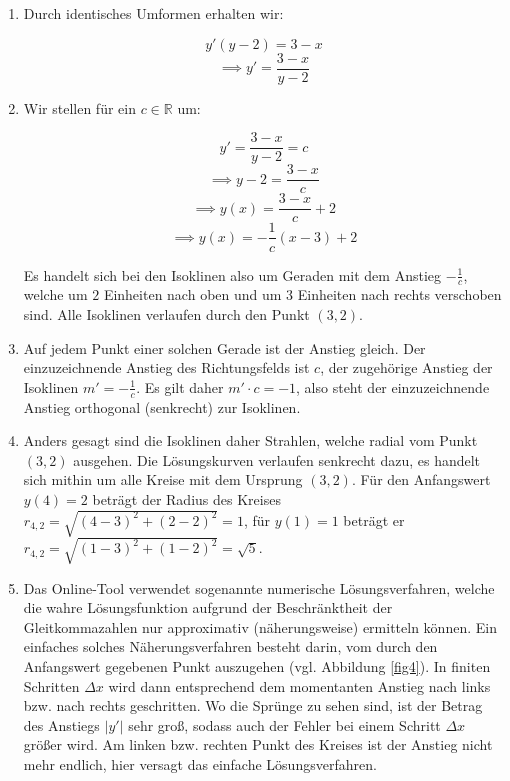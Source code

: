 \item

\begin{enumerate}
\item Durch identisches Umformen erhalten wir:

$$y'(y-2) = 3-x$$
$$\implies y' = \frac{3-x}{y-2}$$

\item Wir stellen für ein $c \in \mathbb{R}$ um:

$$y' = \frac{3-x}{y-2} = c$$
$$\implies y-2 = \frac{3-x}{c}$$
$$\implies y(x) = \frac{3-x}{c}+2$$
$$\implies y(x) = -\frac{1}{c}(x-3)+2$$

Es handelt sich bei den Isoklinen also um Geraden mit dem Anstieg $-\frac{1}{c}$, welche um $2$ Einheiten nach oben und um $3$ Einheiten nach rechts verschoben sind. Alle Isoklinen verlaufen durch den Punkt $(3,2)$.

\item Auf jedem Punkt einer solchen Gerade ist der Anstieg gleich. Der einzuzeichnende Anstieg des Richtungsfelds ist $c$, der zugehörige Anstieg der Isoklinen $m'=-\frac{1}{c}$. Es gilt daher $m'\cdot c = -1$, also steht der einzuzeichnende Anstieg orthogonal (senkrecht) zur Isoklinen.

\item Anders gesagt sind die Isoklinen daher Strahlen, welche radial vom Punkt $(3,2)$ ausgehen. Die Lösungskurven verlaufen senkrecht dazu, es handelt sich mithin um alle Kreise mit dem Ursprung $(3,2)$. Für den Anfangswert $y(4)=2$ beträgt der Radius des Kreises $r_{4,2} = \sqrt{(4-3)^2+(2-2)^2} = 1$, für $y(1)=1$ beträgt er $r_{4,2} = \sqrt{(1-3)^2+(1-2)^2} = \sqrt{5}$.

\item Das Online-Tool verwendet sogenannte numerische Lösungsverfahren, welche die wahre Lösungsfunktion aufgrund der Beschränktheit der Gleitkommazahlen nur approximativ (näherungsweise) ermitteln können. Ein einfaches solches Näherungsverfahren besteht darin, vom durch den Anfangswert gegebenen Punkt auszugehen (vgl. Abbildung \ref{fig4}). In finiten Schritten $\Delta x$ wird dann entsprechend dem momentanten Anstieg nach links bzw. nach rechts geschritten. Wo die Sprünge zu sehen sind, ist der Betrag des Anstiegs $|y'|$ sehr groß, sodass auch der Fehler bei einem Schritt $\Delta x$ größer wird. Am linken bzw. rechten Punkt des Kreises ist der Anstieg nicht mehr endlich, hier versagt das einfache Lösungsverfahren.

\end{enumerate}


